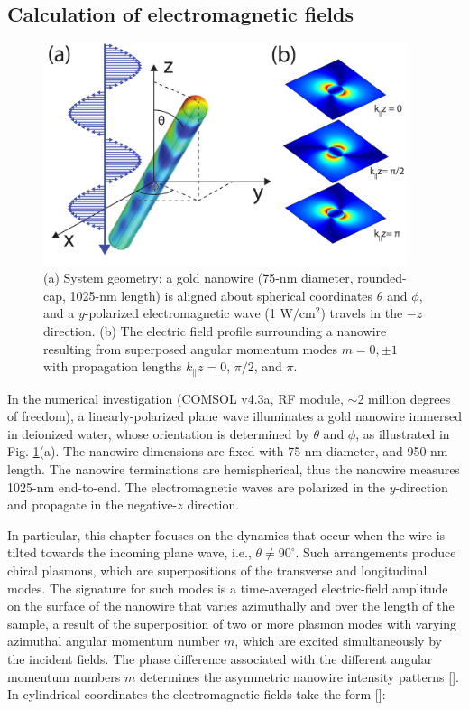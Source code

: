 \subsection{Calculation of electromagnetic fields}
\begin{figure}[ht]
\centering\includegraphics[width=0.95\textwidth]{SetupPicMatt.pdf}
\caption{(a) System geometry: a gold nanowire (75-nm diameter, rounded-cap, 1025-nm length) is aligned about spherical coordinates $\theta$ and $\phi$, and a $y$-polarized electromagnetic wave (1 W$/$cm$^2$) travels in the $-z$ direction. (b) The electric field profile surrounding a nanowire resulting from superposed angular momentum modes $m=0,\pm1$ with propagation lengths
$k_{\parallel}z = 0$, $\pi/2$, and $\pi$.\label{setup}}
\end{figure}

In the numerical investigation (COMSOL v4.3a, RF module, $\sim$2 million degrees of freedom), a linearly-polarized plane wave illuminates a gold nanowire immersed in deionized water, whose orientation is determined by $\theta$ and $\phi$, as illustrated in Fig. \ref{setup}(a). The nanowire dimensions are fixed with 75-nm diameter, and 950-nm length.  The nanowire terminations are hemispherical, thus the nanowire measures 1025-nm end-to-end.
 The electromagnetic waves are polarized in the $y$-direction and propagate in the negative-$z$ direction.

In particular, this chapter focuses on the dynamics that occur when the wire is tilted towards the incoming plane wave, i.e., $\theta \neq 90^\circ$. Such arrangements produce chiral plasmons, which are superpositions of the transverse and longitudinal modes.  The signature for such modes is a time-averaged electric-field amplitude on the surface of the nanowire that varies azimuthally and over the length of the sample, a result of the superposition of two or more plasmon modes with varying azimuthal angular momentum number $m$, which are excited simultaneously by the incident fields.  The phase difference associated with the different angular momentum numbers $m$ determines the asymmetric nanowire intensity patterns [\cite{Zhang2011}]. In cylindrical coordinates the electromagnetic fields take the form [\cite{Chang2007}]:

